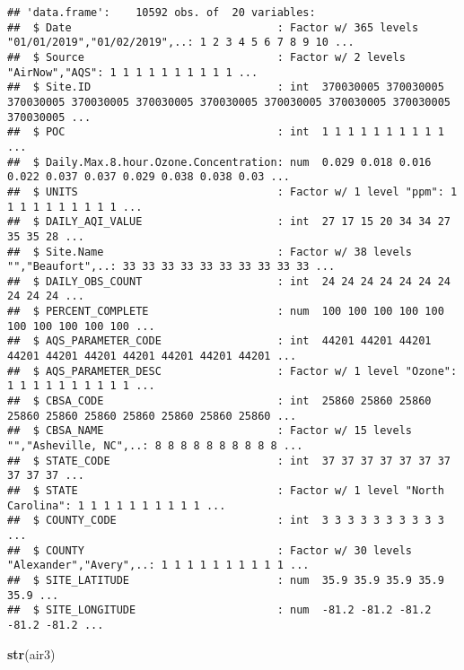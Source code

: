 \documentclass[]{article}
\newenvironment{Shaded}{\begin{snugshade}}{\end{snugshade}}
\newcommand{\KeywordTok}[1]{\textcolor[rgb]{0.13,0.29,0.53}{\textbf{#1}}}
\newcommand{\NormalTok}[1]{#1}
\begin{document}
\begin{verbatim}
## 'data.frame':    10592 obs. of  20 variables:
##  $ Date                                : Factor w/ 365 levels "01/01/2019","01/02/2019",..: 1 2 3 4 5 6 7 8 9 10 ...
##  $ Source                              : Factor w/ 2 levels "AirNow","AQS": 1 1 1 1 1 1 1 1 1 1 ...
##  $ Site.ID                             : int  370030005 370030005 370030005 370030005 370030005 370030005 370030005 370030005 370030005 370030005 ...
##  $ POC                                 : int  1 1 1 1 1 1 1 1 1 1 ...
##  $ Daily.Max.8.hour.Ozone.Concentration: num  0.029 0.018 0.016 0.022 0.037 0.037 0.029 0.038 0.038 0.03 ...
##  $ UNITS                               : Factor w/ 1 level "ppm": 1 1 1 1 1 1 1 1 1 1 ...
##  $ DAILY_AQI_VALUE                     : int  27 17 15 20 34 34 27 35 35 28 ...
##  $ Site.Name                           : Factor w/ 38 levels "","Beaufort",..: 33 33 33 33 33 33 33 33 33 33 ...
##  $ DAILY_OBS_COUNT                     : int  24 24 24 24 24 24 24 24 24 24 ...
##  $ PERCENT_COMPLETE                    : num  100 100 100 100 100 100 100 100 100 100 ...
##  $ AQS_PARAMETER_CODE                  : int  44201 44201 44201 44201 44201 44201 44201 44201 44201 44201 ...
##  $ AQS_PARAMETER_DESC                  : Factor w/ 1 level "Ozone": 1 1 1 1 1 1 1 1 1 1 ...
##  $ CBSA_CODE                           : int  25860 25860 25860 25860 25860 25860 25860 25860 25860 25860 ...
##  $ CBSA_NAME                           : Factor w/ 15 levels "","Asheville, NC",..: 8 8 8 8 8 8 8 8 8 8 ...
##  $ STATE_CODE                          : int  37 37 37 37 37 37 37 37 37 37 ...
##  $ STATE                               : Factor w/ 1 level "North Carolina": 1 1 1 1 1 1 1 1 1 1 ...
##  $ COUNTY_CODE                         : int  3 3 3 3 3 3 3 3 3 3 ...
##  $ COUNTY                              : Factor w/ 30 levels "Alexander","Avery",..: 1 1 1 1 1 1 1 1 1 1 ...
##  $ SITE_LATITUDE                       : num  35.9 35.9 35.9 35.9 35.9 ...
##  $ SITE_LONGITUDE                      : num  -81.2 -81.2 -81.2 -81.2 -81.2 ...
\end{verbatim}

\begin{Shaded}
\begin{Highlighting}[]
\KeywordTok{str}\NormalTok{(air3)}
\end{Highlighting}
\end{Shaded}
\end{document}
